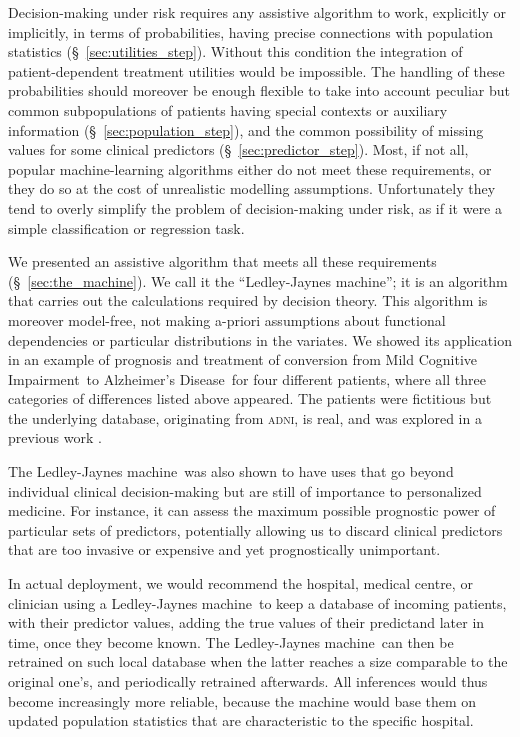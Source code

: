 \documentclass[utf8]{FrontiersinHarvard} %
\newcommand*{\sect}{\S}%
\renewcommand*{\|}[1][]{\nonscript\:#1\vert\nonscript\:\mathopen{}}
\newcommand*{\ad}{Alzheimer's Disease}
\newcommand*{\mci}{Mild Cognitive Impairment}
\newcommand*{\ljm}{Ledley-Jaynes machine}
\newcommand*{\adni}{\textsc{adni}}
\begin{document}
Decision-making under risk requires any assistive algorithm to work, explicitly or implicitly, in terms of probabilities, having precise connections with population statistics (\sect~\ref{sec:utilities_step}). Without this condition the integration of patient-dependent treatment utilities would be impossible. The handling of these probabilities should moreover be enough flexible to take into account peculiar but common subpopulations of patients having special contexts or auxiliary information (\sect~\ref{sec:population_step}), and the common possibility of missing values for some clinical predictors (\sect~\ref{sec:predictor_step}). Most, if not all, popular machine-learning algorithms either do not meet these requirements, or they do so at the cost of unrealistic modelling assumptions. Unfortunately they tend to overly simplify the problem of decision-making under risk, as if it were a simple classification or regression task.

We presented an assistive algorithm that meets all these requirements (\sect~\ref{sec:the_machine}). We call it the \enquote{\ljm}; it is an algorithm that carries out the calculations required by decision theory. This algorithm is moreover model-free, not making a-priori assumptions about functional dependencies or particular distributions in the variates. We showed its application in an example of prognosis and treatment of conversion from \mci\ to \ad\ for four different patients, where all three categories of differences listed above appeared. The patients were fictitious but the underlying database, originating from \adni, is real, and was explored in a previous work \citep{ryeetal2022}.

The \ljm\ was also shown to have uses that go beyond individual clinical decision-making but are still of importance to personalized medicine. For instance, it can assess the maximum possible prognostic power of particular sets of predictors, potentially allowing us to discard clinical predictors that are too invasive or expensive and yet prognostically unimportant.

In actual deployment, we would recommend the hospital, medical centre, or clinician using a \ljm\ to keep a database of incoming patients, with their predictor values, adding the true values of their predictand later in time, once they become known. The \ljm\ can then be retrained on such local database when the latter reaches a size comparable to the original one's, and periodically retrained afterwards. All inferences would thus become increasingly more reliable, because the machine would base them on updated population statistics that are characteristic to the specific hospital.
\end{document}
